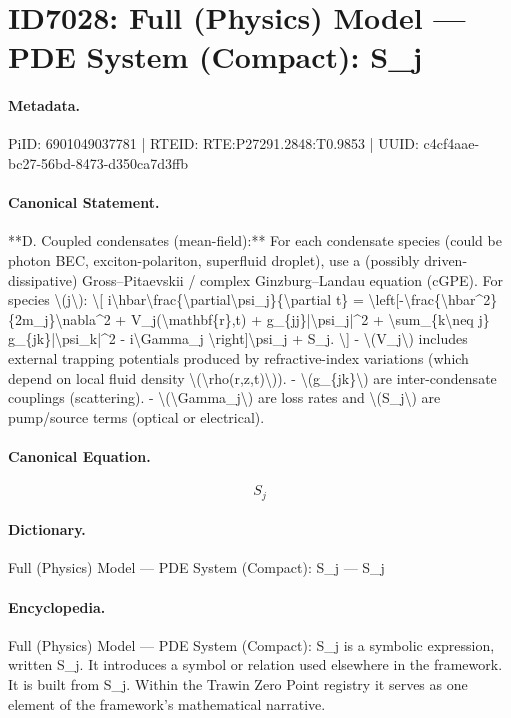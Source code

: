 \section*{ID7028: Full (Physics) Model — PDE System (Compact): S\_j}
\paragraph{Metadata.}
PiID: 6901049037781 | RTEID: RTE:P27291.2848:T0.9853 | UUID: c4cf4aae-bc27-56bd-8473-d350ca7d3ffb

\paragraph{Canonical Statement.}
**D. Coupled condensates (mean-field):** For each condensate species (could be photon BEC, exciton-polariton, superfluid droplet), use a (possibly driven-dissipative) Gross–Pitaevskii / complex Ginzburg–Landau equation (cGPE). For species \textbackslash{}(j\textbackslash{}): \textbackslash{}[ i\textbackslash{}hbar\textbackslash{}frac\{\textbackslash{}partial\textbackslash{}psi\_j\}\{\textbackslash{}partial t\} = \textbackslash{}left[-\textbackslash{}frac\{\textbackslash{}hbar\textasciicircum{}2\}\{2m\_j\}\textbackslash{}nabla\textasciicircum{}2 + V\_j(\textbackslash{}mathbf\{r\},t) + g\_\{jj\}|\textbackslash{}psi\_j|\textasciicircum{}2 + \textbackslash{}sum\_\{k\textbackslash{}neq j\} g\_\{jk\}|\textbackslash{}psi\_k|\textasciicircum{}2 - i\textbackslash{}Gamma\_j \textbackslash{}right]\textbackslash{}psi\_j + S\_j. \textbackslash{}] - \textbackslash{}(V\_j\textbackslash{}) includes external trapping potentials produced by refractive-index variations (which depend on local fluid density \textbackslash{}(\textbackslash{}rho(r,z,t)\textbackslash{})). - \textbackslash{}(g\_\{jk\}\textbackslash{}) are inter-condensate couplings (scattering). - \textbackslash{}(\textbackslash{}Gamma\_j\textbackslash{}) are loss rates and \textbackslash{}(S\_j\textbackslash{}) are pump/source terms (optical or electrical).

\paragraph{Canonical Equation.}
\[
S_j
\]

\paragraph{Dictionary.}
Full (Physics) Model — PDE System (Compact): S\_j — S\_j

\paragraph{Encyclopedia.}
Full (Physics) Model — PDE System (Compact): S\_j is a symbolic expression, written S\_j. It introduces a symbol or relation used elsewhere in the framework. It is built from S\_j. Within the Trawin Zero Point registry it serves as one element of the framework's mathematical narrative.
